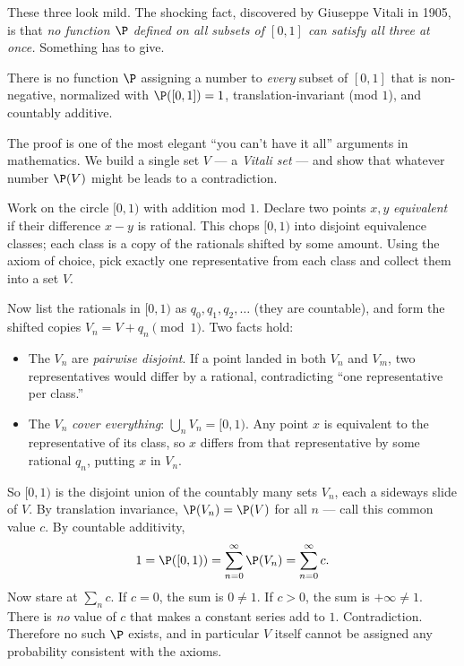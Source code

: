 These three look mild. The shocking fact, discovered by Giuseppe Vitali in 1905,
is that \emph{no function $\P$ defined on all subsets of $[0,1]$ can satisfy all
three at once.} Something has to give.

\begin{theorem}
\label{ch36:vitali}
There is no function $\P$ assigning a number to \emph{every} subset of $[0,1]$
that is non-negative, normalized with $\P([0,1])=1$, translation-invariant (mod
$1$), and countably additive.
\end{theorem}

\begin{whybox}
The proof is one of the most elegant ``you can't have it all'' arguments in
mathematics. We build a single set $V$ --- a \emph{Vitali set} --- and show that
whatever number $\P(V)$ might be leads to a contradiction.

Work on the circle $[0,1)$ with addition mod $1$. Declare two points $x,y$
\emph{equivalent} if their difference $x-y$ is rational. This chops $[0,1)$ into
disjoint equivalence classes; each class is a copy of the rationals shifted by
some amount. Using the axiom of choice, pick exactly one representative from each
class and collect them into a set $V$.

Now list the rationals in $[0,1)$ as $q_0, q_1, q_2, \dots$ (they are countable),
and form the shifted copies $V_n = V + q_n \pmod 1$. Two facts hold:

\begin{itemize}
  \item The $V_n$ are \emph{pairwise disjoint}. If a point landed in both $V_n$
        and $V_m$, two representatives would differ by a rational, contradicting
        ``one representative per class.''
  \item The $V_n$ \emph{cover everything}: $\bigcup_n V_n = [0,1)$. Any point $x$
        is equivalent to the representative of its class, so $x$ differs from that
        representative by some rational $q_n$, putting $x$ in $V_n$.
\end{itemize}

So $[0,1)$ is the disjoint union of the countably many sets $V_n$, each a sideways
slide of $V$. By translation invariance, $\P(V_n) = \P(V)$ for all $n$ --- call
this common value $c$. By countable additivity,
\[
  1 = \P([0,1)) = \sum_{n=0}^{\infty} \P(V_n) = \sum_{n=0}^{\infty} c .
\]
Now stare at $\sum_n c$. If $c = 0$, the sum is $0 \ne 1$. If $c > 0$, the sum is
$+\infty \ne 1$. There is \emph{no} value of $c$ that makes a constant series add
to $1$. Contradiction. Therefore no such $\P$ exists, and in particular $V$ itself
cannot be assigned any probability consistent with the axioms.
\end{whybox}

